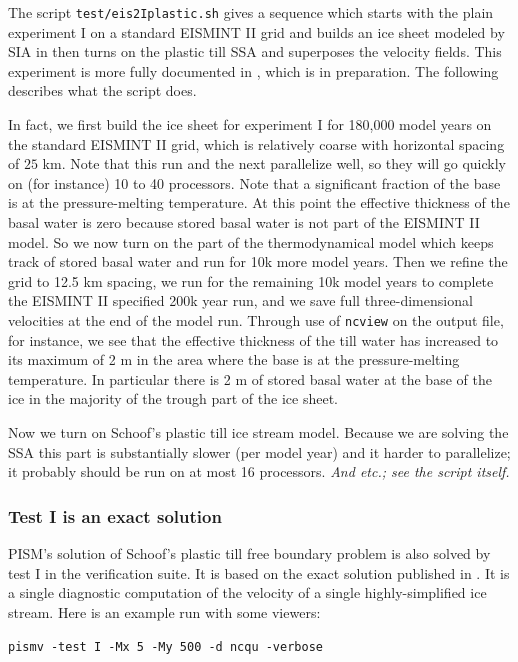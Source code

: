 \documentclass[11pt,final]{amsart}
\begin{document}
The script \verb|test/eis2Iplastic.sh| gives a sequence which starts with the plain experiment I on a standard EISMINT II grid and builds an ice sheet modeled by SIA in then turns on the plastic till SSA and superposes the velocity fields.  This experiment is more fully documented in \cite{BuelerBrownSuper}, which is in preparation.  The following describes what the script does.

\medskip
\scriptsize
In fact, we first build the ice sheet for experiment I for 180,000 model years on the standard EISMINT II grid, which is relatively coarse with horizontal spacing of $25$ km.  Note that this run and the next parallelize well, so they will go quickly on (for instance) 10 to 40 processors.  Note that a significant fraction of the base is at the pressure-melting temperature.  At this point the effective thickness of the basal water is zero because stored basal water is not part of the EISMINT II model.  So we now turn on the part of the thermodynamical model which keeps track of stored basal water and run for 10k more model years.  Then we refine the grid to 12.5 km spacing, we run for the remaining 10k model years to complete the EISMINT II specified 200k year run, and we save full three-dimensional velocities at the end of the model run.  Through use of \verb|ncview| on the output file, for instance, we see that the effective thickness of the till water has increased to its maximum of 2 m in the area where the base is at the pressure-melting temperature.  In particular there is 2 m of stored basal water at the base of the ice in the majority of the trough part of the ice sheet.

Now we turn on Schoof's plastic till ice stream model.  Because we are solving the SSA this part is substantially slower (per model year) and it harder to parallelize; it probably should be run on at most 16 processors. \emph{And etc.; see the script itself.}
\normalsize
\medskip

\subsubsection*{Test I is an exact solution}  PISM's solution of Schoof's plastic till free boundary problem is also solved by test I in the verification suite.  It is based on the exact solution published in \cite{SchoofStream}.  It is a single diagnostic computation of the velocity of a single highly-simplified ice stream.  Here is an example run with some viewers:

\verb|pismv -test I -Mx 5 -My 500 -d ncqu -verbose|
\end{document}
